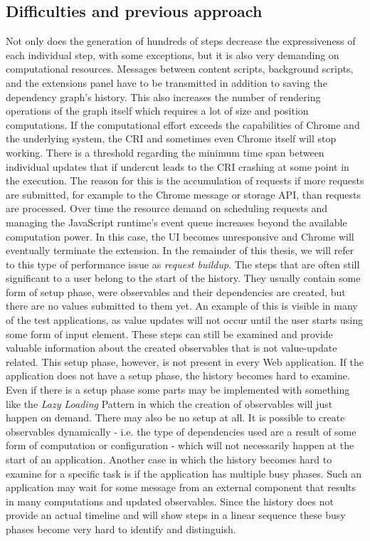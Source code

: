 \subsection{Difficulties and previous approach}
Not only does the generation of hundreds of steps decrease the expressiveness of each individual step, with some exceptions, but it is also very demanding on computational resources. Messages between content scripts, background scripts, and the extensions panel have to be transmitted in addition to saving the dependency graph's history. This also increases the number of rendering operations of the graph itself which requires a lot of size and position computations. If the computational effort exceeds the capabilities of Chrome and the underlying system, the CRI and sometimes even Chrome itself will stop working. There is a threshold regarding the minimum time span between individual updates that if undercut leads to the CRI crashing at some point in the execution. The reason for this is the accumulation of requests if more requests are submitted, for example to the Chrome message or storage API, than requests are processed. Over time the resource demand on scheduling requests and managing the JavaScript runtime's event queue increases beyond the available computation power. In this case, the UI becomes unresponsive and Chrome will eventually terminate the extension. In the remainder of this thesis, we will refer to this type of performance issue as \emph{request buildup}.
The steps that are often still significant to a user belong to the start of the history. They usually contain some form of setup phase, were observables and their dependencies are created, but there are no values submitted to them yet. An example of this is visible in many of the test applications, as value updates will not occur until the user starts using some form of input element. These steps can still be examined and provide valuable information about the created observables that is not value-update related. This setup phase, however, is not present in every Web application. If the application does not have a setup phase, the history becomes hard to examine. Even if there is a setup phase some parts may be implemented with something like the \emph{Lazy Loading} Pattern \cite{Lazy} in which the creation of observables will just happen on demand. There may also be no setup at all. It is possible to create observables dynamically - i.e. the type of dependencies used are a result of some form of computation or configuration - which will not necessarily happen at the start of an application. Another case in which the history becomes hard to examine for a specific task is if the application has multiple busy phases. Such an application may wait for some message from an external component that results in many computations and updated observables. Since the history does not provide an actual timeline and will show steps in a linear sequence these busy phases become very hard to identify and distinguish. 
